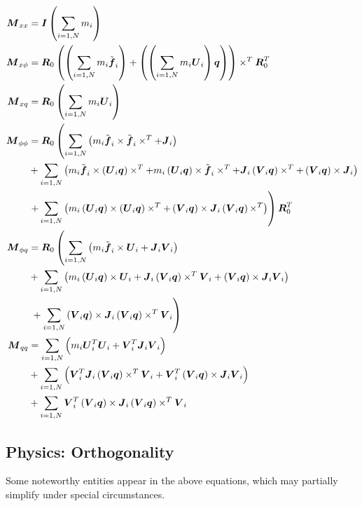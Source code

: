 \begin{align}
	\T{M}_{xx}	&= \T{I} \plbr{\sum_{i=1,N} m_i} \\
	\T{M}_{x\phi}	&= \T{R}_0 \plbr{\plbr{
		\sum_{i=1,N} m_i \tilde{\T{f}}_i
	} + \plbr{\plbr{
		\sum_{i=1,N} m_i \T{U}_i
	} \T{q}}} \times^T \T{R}_0^T \\
	\T{M}_{xq}	&= \T{R}_0 \plbr{\sum_{i=1,N} m_i \T{U}_i} \\
	\T{M}_{\phi\phi}&= \T{R}_0 \lplbr{
		\sum_{i=1,N} \plbr{
			m_i \tilde{\T{f}}_i \times \tilde{\T{f}}_i\times^T
			+ \T{J}_i
		}
	} \nonumber \\
			& \mbox{} + \sum_{i=1,N} \plbr{
			m_i \tilde{\T{f}}_i \times \plbr{\T{U}_i \T{q}}\times^T
			+ m_i \plbr{\T{U}_i \T{q}}\times \tilde{\T{f}}_i \times^T
			+ \T{J}_i \plbr{\T{V}_i \T{q}}\times^T
			+ \plbr{\T{V}_i \T{q}}\times \T{J}_i
	} \nonumber \\
			& \rplbr{ \mbox + \sum_{i=1,N} \plbr{
			m_i \plbr{\T{U}_i \T{q}}\times \plbr{\T{U}_i \T{q}}\times^T
			+ \plbr{\T{V}_i \T{q}}\times \T{J}_i \plbr{\T{V}_i \T{q}}\times^T
	}} \T{R}_0^T \\
	\T{M}_{\phi q}	&= \T{R}_0 \lplbr{
		\sum_{i=1,N} \plbr{
			m_i \tilde{\T{f}}_i \times \T{U}_i
			+ \T{J}_i \T{V}_i
		}
	} \nonumber \\
			& \mbox{} + \sum_{i=1,N} \plbr{
			m_i \plbr{\T{U}_i \T{q}} \times \T{U}_i
			+ \T{J}_i \plbr{\T{V}_i \T{q}}\times^T \T{V}_i
			+ \plbr{\T{V}_i \T{q}}\times \T{J}_i \T{V}_i
	} \nonumber \\
			& \rplbr{ \mbox{} + \sum_{i=1,N} \plbr{\T{V}_i \T{q}}\times \T{J}_i \plbr{\T{V}_i \T{q}}\times^T \T{V}_i
	} \\
	\T{M}_{qq}	&= \sum_{i=1,N} \plbr{
		m_i \T{U}_i^T \T{U}_i
		+ \T{V}_i^T \T{J}_i \T{V}_i
	} \nonumber \\
			& \mbox{} + \sum_{i=1,N} \plbr{
			\T{V}_i^T \T{J}_i \plbr{\T{V}_i \T{q}}\times^T \T{V}_i
			+ \T{V}_i^T \plbr{\T{V}_i \T{q}}\times \T{J}_i \T{V}_i
	} \nonumber \\
			& \mbox{} + \sum_{i=1,N}
			\T{V}_i^T \plbr{\T{V}_i \T{q}}\times \T{J}_i \plbr{\T{V}_i \T{q}}\times^T \T{V}_i
\end{align}

\subsection{Physics: Orthogonality}
Some noteworthy entities appear in the above equations, which may partially
simplify under special circumstances.

